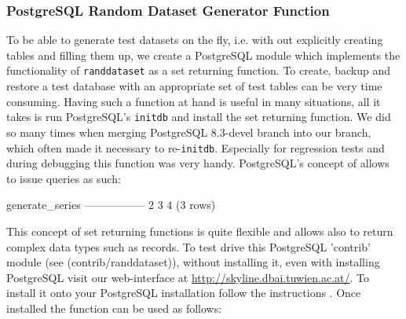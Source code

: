 \subsubsection{PostgreSQL Random Dataset Generator Function}
\label{sec:set-returning-function}

To be able to generate test datasets on the fly, i.e. with out
explicitly creating tables and filling them up, we create a PostgreSQL
module which implements the functionality of \texttt{randdataset} as a
set returning function. To create, backup and restore a test database
with an appropriate set of test tables can be very time
consuming. Having such a function at hand is useful in many situations,
all it takes is run PostgreSQL's \texttt{initdb} and install the set
returning function. We did so many times when merging PostgreSQL
8.3-devel branch into our branch, which often made it necessary to
re-\texttt{initdb}. Especially for regression tests and during
debugging this function was very handy. PostgreSQL's concept of
 allows to
issue queries as such:

\begin{interactive}
 generate_series
-----------------
               2
               3
               4
(3 rows)
\end{interactive}

This concept of set returning functions is quite flexible and allows
also to return complex data types such as records. To test drive this
PostgreSQL 'contrib' module (see
\srcref(contrib/randdataset)), without installing it, even with
installing PostgreSQL visit our web-interface at
\url{http://skyline.dbai.tuwien.ac.at/}. To install it onto your
PostgreSQL installation follow the instructions
. Once installed the
function can be used as follows:

